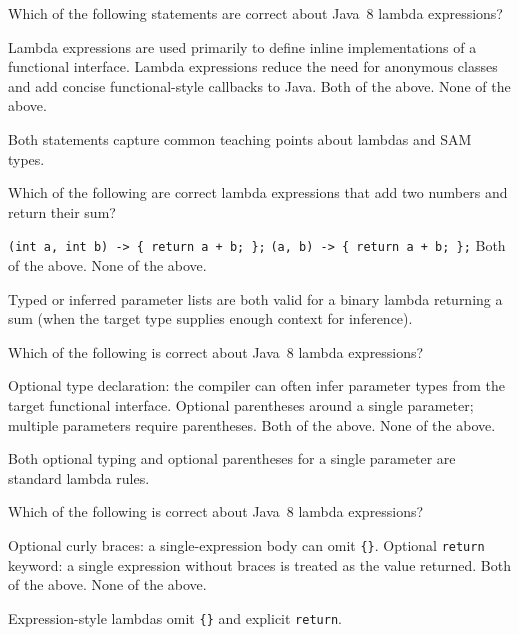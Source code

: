 \question[4]
Which of the following statements are correct about Java~8 lambda expressions?
\begin{choices}
  \choice Lambda expressions are used primarily to define inline implementations of a functional interface.
  \choice Lambda expressions reduce the need for anonymous classes and add concise functional-style callbacks to Java.
  \CorrectChoice Both of the above.
  \choice None of the above.
\end{choices}
\begin{solution}
  Both statements capture common teaching points about lambdas and SAM types.
\end{solution}

\question[4]
Which of the following are correct lambda expressions that add two numbers and return their sum?
\begin{choices}
  \choice \texttt{(int a, int b) -> \{ return a + b; \};}
  \choice \texttt{(a, b) -> \{ return a + b; \};}
  \CorrectChoice Both of the above.
  \choice None of the above.
\end{choices}
\begin{solution}
  Typed or inferred parameter lists are both valid for a binary lambda returning a sum (when the target type supplies enough context for inference).
\end{solution}

\newpage

\question[4]
Which of the following is correct about Java~8 lambda expressions?
\begin{choices}
  \choice Optional type declaration: the compiler can often infer parameter types from the target functional interface.
  \choice Optional parentheses around a single parameter; multiple parameters require parentheses.
  \CorrectChoice Both of the above.
  \choice None of the above.
\end{choices}
\begin{solution}
  Both optional typing and optional parentheses for a single parameter are standard lambda rules.
\end{solution}

\question[4]
Which of the following is correct about Java~8 lambda expressions?
\begin{choices}
  \choice Optional curly braces: a single-expression body can omit \texttt{\{\}}.
  \choice Optional \texttt{return} keyword: a single expression without braces is treated as the value returned.
  \CorrectChoice Both of the above.
  \choice None of the above.
\end{choices}
\begin{solution}
  Expression-style lambdas omit \texttt{\{\}} and explicit \texttt{return}.
\end{solution}

